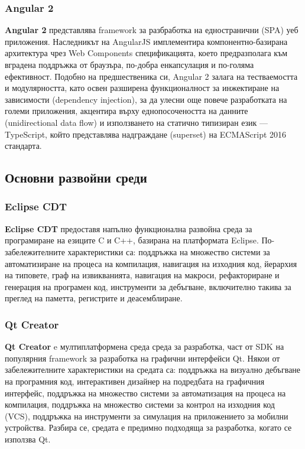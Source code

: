 \documentclass[12pt,a4paper,oneside]{book}
\begin{document}
\subsubsection{Angular 2}

\textbf{Angular 2} представлява framework за разбработка на едностранични
(SPA) уеб приложения. Наследникът на AngularJS имплементира компонентно-базирана
архитектура чрез Web Components спецификацията, което предразполага към вградена
поддръжка от браузъра, по-добра енкапсулация и по-голяма ефективност. Подобно на
предшественика си, Angular 2 залага на тестваемостта и модулярността, като освен
разширена функционалност за инжектиране на зависимости (dependency injection),
за да улесни още повече разработката на големи приложения,
акцентира върху еднопосочеността на данните (unidirectional data flow) и
използването на статично типизиран език --- TypeScript, който представлява
надграждане (superset) на ECMAScript 2016 стандарта.

\subsection{Основни развойни среди}

\subsubsection{Eclipse CDT}

\textbf{Eclipse CDT} предоставя напълно функционална развойна среда за програмиране на
езиците C и C++, базирана на платформата Eclipse. По-забележителните
характеристики са: поддръжка на множество системи за автоматизиране на процеса
на компилация, навигация на изходния код, йерархия на типовете, граф на
извикванията, навигация на макроси, рефакториране и генерация на програмен код,
инструменти за дебъгване, включително такива за преглед на паметта, регистрите и
деасемблиране.

\subsubsection{Qt Creator}

\textbf{Qt Creator} e мултиплатформена среда среда за разработка, част от
SDK на популярния framework за разработка на графични
интерфейси Qt. Някои от забележителните характеристики на средата са: поддръжка
на визуално дебъгване на програмния код, интерактивен дизайнер на подредбата на
графичния интерфейс, поддръжка на множество системи за автоматизация на процеса
на компилация, поддръжка на множество системи за контрол на изходния код (VCS),
поддръжка на инструменти за симулация на приложението за мобилни устройства.
Разбира се, средата е предимно подходяща за разработка, когато се използва Qt.
\end{document}
